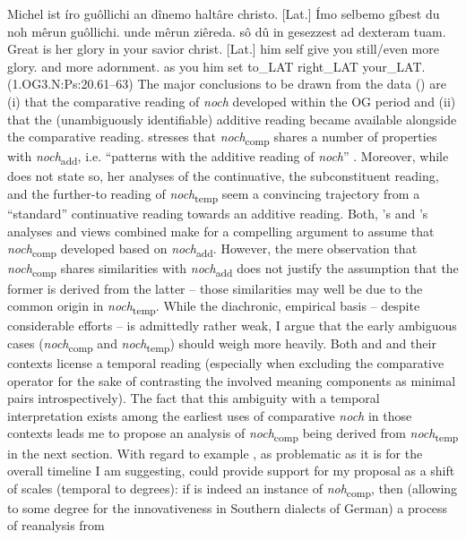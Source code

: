 \documentclass[output=paper]{langsci/langscibook}
\begin{document}
\ea\gll Michel ist íro guôllichi an dînemo haltâre christo. [Lat.] Ímo selbemo gíbest du noh mêrun guôllichi. unde mêrun ziêreda. sô dû in gesezzest ad dexteram tuam.\\
       Great is her glory in your savior christ. [Lat.] him self give you still/even more glory. and more adornment. as you him set to\_LAT right\_LAT your\_LAT.\\
\label{OG3_noch_more_glory_first} \hfill (1.OG3.N:Ps:20.61--63)
\z
The major conclusions to be drawn from the data () are (i) that the comparative reading of \textit{noch} developed within the OG period and (ii) that the (unambiguously identifiable) additive reading became available alongside the comparative reading. \citeauthor{umbach2009a_comp} \citeyearpar{umbach2009a_comp} stresses that \textit{noch}\textsubscript{comp} shares a number of properties with \textit{noch}\textsubscript{add}, i.e. ``patterns with the additive reading of \textit{noch}'' \citep[9]{umbach2009a_comp}. Moreover, while \citeauthor{beck2016a_sub} does not state so, her \citeyearpar{beck2016a_sub} analyses of the continuative, the subconstituent reading, and the further-to reading of \textit{noch}\textsubscript{temp} seem a convincing trajectory from a ``standard'' continuative reading towards an additive reading. Both, \citeauthor{umbach2009a_comp}'s \citeyearpar{umbach2009a_comp} and \citeauthor{beck2016a_sub}'s \citeyearpar{beck2016a_sub} analyses and views combined make for a compelling argument to assume that \textit{noch}\textsubscript{comp} developed based on \textit{noch}\textsubscript{add}. However, the mere observation that \textit{noch}\textsubscript{comp} shares similarities with \textit{noch}\textsubscript{add} does not justify the assumption that the former is derived from the latter -- those similarities may well be due to the common origin in \textit{noch}\textsubscript{temp}. While the diachronic, empirical basis -- despite considerable efforts -- is admittedly rather weak, I argue that the early ambiguous cases (\textit{noch}\textsubscript{comp} and \textit{noch}\textsubscript{temp}) should weigh more heavily. Both  and  and their contexts license a temporal reading (especially when excluding the comparative operator for the sake of contrasting the involved meaning components as minimal pairs introspectively). The fact that this ambiguity with a temporal interpretation exists among the earliest uses of comparative \textit{noch} in those contexts leads me to propose an analysis of \textit{noch}\textsubscript{comp} being derived from \textit{noch}\textsubscript{temp} in the next section. With regard to example , as problematic as it is for the overall timeline I am suggesting,  could provide support for my proposal as a shift of scales (temporal to degrees): if  is indeed an instance of \textit{noh}\textsubscript{comp}, then (allowing to some degree for the innovativeness in Southern dialects of German) a process of reanalysis from 
\end{document}
